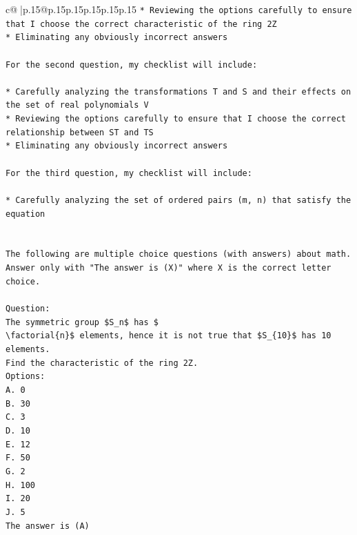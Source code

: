 \documentclass{article}
\begin{document}
{\begin{supertabular}{c@{$\;$}|p{.15\linewidth}@{}p{.15\linewidth}p{.15\linewidth}p{.15\linewidth}p{.15\linewidth}p{.15\linewidth}}
{{{\texttt{* Reviewing the options carefully to ensure that I choose the correct characteristic of the ring 2Z} \\
\texttt{* Eliminating any obviously incorrect answers} \\
\\ 
\texttt{For the second question, my checklist will include:} \\
\\ 
\texttt{* Carefully analyzing the transformations T and S and their effects on the set of real polynomials V} \\
\texttt{* Reviewing the options carefully to ensure that I choose the correct relationship between ST and TS} \\
\texttt{* Eliminating any obviously incorrect answers} \\
\\ 
\texttt{For the third question, my checklist will include:} \\
\\ 
\texttt{* Carefully analyzing the set of ordered pairs (m, n) that satisfy the equation} \\
\\ 
\\ 
\texttt{The following are multiple choice questions (with answers) about math. Answer only with "The answer is (X)" where X is the correct letter choice.} \\
\\ 
\texttt{Question:} \\
\texttt{The symmetric group \$S\_n\$ has \$} \\
\texttt{\textbackslash{}factorial\{n\}\$ elements, hence it is not true that \$S\_\{10\}\$ has 10 elements.} \\
\texttt{Find the characteristic of the ring 2Z.} \\
\texttt{Options:} \\
\texttt{A. 0} \\
\texttt{B. 30} \\
\texttt{C. 3} \\
\texttt{D. 10} \\
\texttt{E. 12} \\
\texttt{F. 50} \\
\texttt{G. 2} \\
\texttt{H. 100} \\
\texttt{I. 20} \\
\texttt{J. 5} \\
\texttt{The answer is (A)} \\
}}}
\end{supertabular}}
\end{document}
